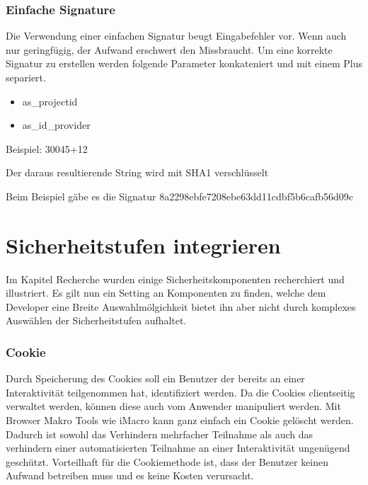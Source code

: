 \subsubsection{Einfache Signature}\label{einfache-signature}

Die Verwendung einer einfachen Signatur beugt Eingabefehler vor. Wenn
auch nur geringfügig, der Aufwand erschwert den Missbraucht. Um eine
korrekte Signatur zu erstellen werden folgende Parameter konkateniert
und mit einem Plus separiert.

\begin{itemize}
\tightlist
\item
  as\_projectid
\item
  as\_id\_provider
\end{itemize}

Beispiel: 30045+12

Der daraus resultierende String wird mit SHA1 verschlüsselt

Beim Beispiel gäbe es die Signatur
8a2298ebfe7208ebe63dd11cdbf5b6cafb56d09c

\newpage

\section{Sicherheitstufen
integrieren}\label{sicherheitstufen-integrieren}

Im Kapitel Recherche wurden einige Sicherheitskomponenten recherchiert
und illustriert. Es gilt nun ein Setting an Komponenten zu finden,
welche dem Developer eine Breite Auswahlmölgichkeit bietet ihn aber
nicht durch komplexes Auswählen der Sicherheitstufen aufhaltet.

\subsubsection{Cookie}\label{cookie}

Durch Speicherung des Cookies soll ein Benutzer der bereits an einer
Interaktivität teilgenommen hat, identifiziert werden. Da die Cookies
clientseitig verwaltet werden, können diese auch vom Anwender
manipuliert werden. Mit Browser Makro Tools wie iMacro kann ganz einfach
ein Cookie gelöscht werden. Dadurch ist sowohl das Verhindern mehrfacher
Teilnahme als auch das verhindern einer automatisierten Teilnahme an
einer Interaktivität ungenügend geschützt. Vorteilhaft für die
Cookiemethode ist, dass der Benutzer keinen Aufwand betreiben muss und
es keine Kosten verursacht.


